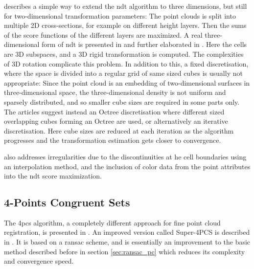 \cite{Dold2007} describes a simple way to extend the \gls{ndt} algorithm to three dimensions, but still for two-dimensional transformation parameters: The point clouds is split into multiple 2D cross-sections, for example on different height layers. Then the sums of the score functions of the different layers are maximized. A real three-dimensional form of \gls{ndt} is presented in \cite{Magn2007} and further elaborated in \cite{Magn2013}. Here the cells are 3D subspaces, and a 3D rigid transformation is computed. The complexities of 3D rotation complicate this problem. In addition to this, a fixed discretisation, where the space is divided into a regular grid of same sized cubes is usually not appropriate: Since the point cloud is an embedding of two-dimensional surfaces in three-dimensional space, the three-dimensional density is not uniform and sparsely distributed, and so smaller cube sizes are required in some parts only. The articles suggest instead an Octree discretisation where different sized overlapping cubes forming an Octree are used, or alternatively an iterative discretisation. Here cube sizes are reduced at each iteration as the algorithm progresses and the transformation estimation gets closer to convergence.

\cite{Magn2013} also addresses irregularities due to the discontinuities at he cell boundaries using an interpolation method, and the inclusion of color data from the point attributes into the \gls{ndt} score maximization.


\subsection{4-Points Congruent Sets}
The \gls{4pcs} algorithm, a completely different approach for fine point cloud registration, is presented in \cite{Aige2008}. An improved version called Super-4PCS is described in \cite{Mell2014}. It is based on a \gls{ransac} scheme, and is essentially an improvement to the basic method described before in section \ref{sec:ransac_pc} which reduces its complexity and convergence speed.

